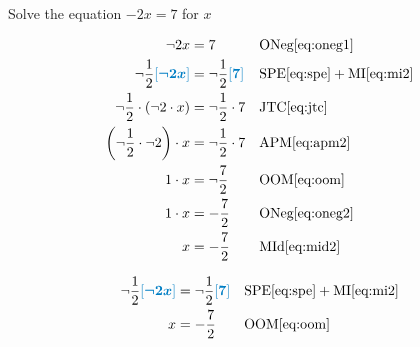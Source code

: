 \begin{example}[id:20141206-102723] \label{20141206-102723} \hfill \\

Solve the equation $-2x=7$ for $x$

\soln

\solnsteps
\begin{align*}
\neg 2x &= 7  && \text{ONeg} \eqref{eq:oneg1} \\
\neg \dfrac{1}{2}\farg{\neg 2x}  &= \neg \dfrac{1}{2}\farg{7} && \text{SPE} \eqref{eq:spe} + \text{MI} \eqref{eq:mi2} \\
\neg \dfrac{1}{2} \cdot \left( \neg 2 \cdot x \right) &= \neg \dfrac{1}{2} \cdot 7 && \text{JTC} \eqref{eq:jtc} \\
\left(\neg\dfrac{1}{2} \cdot \neg 2 \right) \cdot x &= \neg \dfrac{1}{2} \cdot 7  && \text{APM} \eqref{eq:apm2} \\ 
1\cdot x &= \neg \dfrac{7}{2}  && \text{OOM} \eqref{eq:oom} \\
1\cdot x &= -\dfrac{7}{2}  && \text{ONeg} \eqref{eq:oneg2} \\
x &= -\dfrac{7}{2}  && \text{MId} \eqref{eq:mid2}  
\end{align*}

\soln

\lesssteps
\begin{align*}
\neg \dfrac{1}{2}\farg{\neg 2x}  &= \neg \dfrac{1}{2}\farg{7} && \text{SPE} \eqref{eq:spe} + \text{MI} \eqref{eq:mi2} \\ 
x &= -\dfrac{7}{2}  && \text{OOM} \eqref{eq:oom}
\end{align*}
\end{example}


